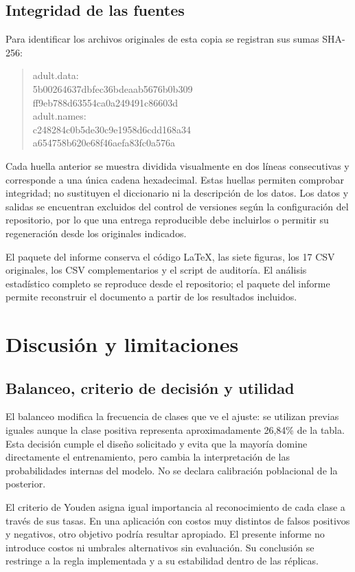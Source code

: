 \documentclass[11pt,a4paper]{article}
\begin{document}
\subsection{Integridad de las fuentes}
Para identificar los archivos originales de esta copia se registran sus sumas SHA-256:
\begin{quote}\small\ttfamily
adult.data:\\
5b00264637dbfec36bdeaab5676b0b309\\
ff9eb788d63554ca0a249491c86603d\\[4pt]
adult.names:\\
c248284c0b5de30c9e1958d6cdd168a34\\
a654758b620e68f46aefa83fc0a576a
\end{quote}
Cada huella anterior se muestra dividida visualmente en dos líneas consecutivas y corresponde a una única cadena hexadecimal. Estas huellas permiten comprobar integridad; no sustituyen el diccionario ni la descripción de los datos. Los datos y salidas se encuentran excluidos del control de versiones según la configuración del repositorio, por lo que una entrega reproducible debe incluirlos o permitir su regeneración desde los originales indicados.

El paquete del informe conserva el código LaTeX, las siete figuras, los 17 CSV originales, los CSV complementarios y el script de auditoría. El análisis estadístico completo se reproduce desde el repositorio; el paquete del informe permite reconstruir el documento a partir de los resultados incluidos.

\section{Discusión y limitaciones}
\subsection{Balanceo, criterio de decisión y utilidad}
El balanceo modifica la frecuencia de clases que ve el ajuste: se utilizan previas iguales aunque la clase positiva representa aproximadamente 26,84\% de la tabla. Esta decisión cumple el diseño solicitado y evita que la mayoría domine directamente el entrenamiento, pero cambia la interpretación de las probabilidades internas del modelo. No se declara calibración poblacional de la posterior.

El criterio de Youden asigna igual importancia al reconocimiento de cada clase a través de sus tasas. En una aplicación con costos muy distintos de falsos positivos y negativos, otro objetivo podría resultar apropiado. El presente informe no introduce costos ni umbrales alternativos sin evaluación. Su conclusión se restringe a la regla implementada y a su estabilidad dentro de las réplicas.
\end{document}
